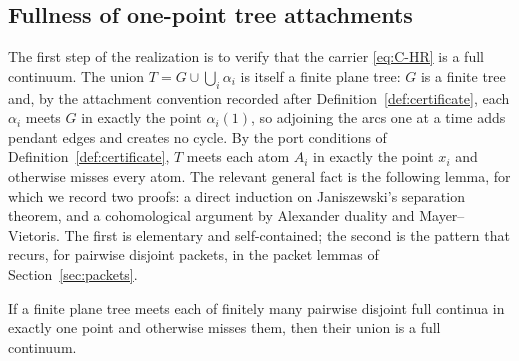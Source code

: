 \subsection*{Fullness of one-point tree attachments}
The first step of the realization is to verify that the carrier
\eqref{eq:C-HR} is a full continuum.  The union
$T=G\cup\bigcup_i\alpha_i$ is itself a finite plane tree: $G$ is a finite
tree and, by the attachment convention recorded after
Definition~\ref{def:certificate}, each $\alpha_i$ meets $G$ in exactly
the point $\alpha_i(1)$, so adjoining the arcs one at a time adds pendant
edges and creates no cycle.  By the port conditions of
Definition~\ref{def:certificate}, $T$ meets each atom $A_i$ in exactly the
point $x_i$ and otherwise misses every atom.  The relevant general fact is
the following lemma, for which we record two proofs: a direct induction on
Janiszewski's separation theorem, and a cohomological argument by
Alexander duality and Mayer--Vietoris.  The first is elementary and
self-contained; the second is the pattern that recurs, for pairwise
disjoint packets, in the packet lemmas of Section~\ref{sec:packets}.

\begin{lemma}
\label{lem:tree-full}
If a finite plane tree meets each of finitely many pairwise disjoint full
continua in exactly one point and otherwise misses them, then their union
is a full continuum.
\end{lemma}

